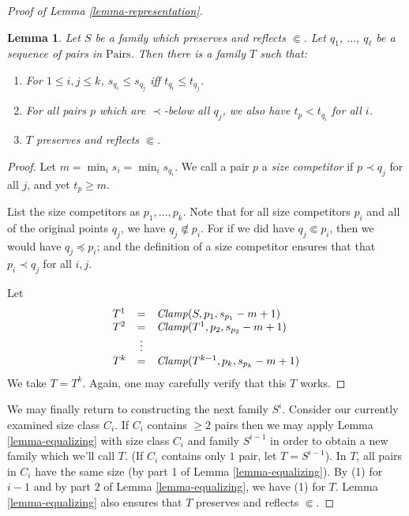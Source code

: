\documentclass[letterpaper]{article} %
\newtheorem{lemma}[theorem]{Lemma}
\theoremstyle{definition}
\newcommand{\Pairs}{\mbox{Pairs}}
\newcommand{\Clamp}{\protect{\mbox{\textit{Clamp}}}}
\newcommand{\precsubseteq}{\Subset}
\begin{document}
\begin{proof}[Proof of Lemma \ref{lemma-representation}]
\begin{lemma}

Let $S$ be a family which  preserves and reflects $\precsubseteq$.  
Let $q_1$, $\ldots$, $q_{\ell}$ be a sequence of pairs in $\Pairs$.  
Then there is a family $T$ such that:

\begin{enumerate} 
    \item For $1\leq i,j \leq k$, $s_{q_i} \leq s_{q_j}$ iff $t_{q_i} \leq t_{q_j}$. \label{competitor1}
    
    \item For all pairs $p $ which are $\prec$-below all $q_j$, we also have $t_{p}  <  t_{q_i}$ for all $i$. \label{competitor2}
  
    \item $T$ preserves and reflects $\precsubseteq$. 

\end{enumerate}

\label{lemma-sizeadjustment}
\end{lemma}
\begin{proof}
Let $m =  \min_i s_{i} = \min_i s_{q_i}$.
We call a pair $p$ a \emph{size competitor} if 
$p\prec q_j$ for all $j$, and yet  $t_p \geq m$.

List the size competitors as $p_1, \ldots, p_k$. 
 Note that for all size competitors $p_i$ and all of the original points
 $q_j$,  we have $q_j \not \precsubseteq p_i$.
For if we did have $q_j \precsubseteq p_i$, then we would have 
$q_j \preceq p_i$; and the definition of a size competitor
ensures that that $p_i \prec q_j$ for all $i, j$.


 Let \[ \begin{array}{lcl}
 T^1  & = &  \Clamp(S,p_1,  s_{p_1} -m + 1)\\

T^2 & = & \Clamp(T^1,p_2,  s_{p_2}-m + 1 )\\
  & \vdots   & \\
T^{k} & = & \Clamp(T^{k-1},p_k, s_{p_k}-m + 1 )\\
\end{array}
\]
We take $T = T^{k}$.  Again, one may carefully verify that this $T$ works.  %
\end{proof}


We may finally return to constructing the next family $S^i$.  Consider our currently examined size class $C_i$.  If $C_i$ contains $\ge 2$ pairs then we may apply Lemma \ref{lemma-equalizing} with size class $C_i$ and family $S^{i-1}$ in order to obtain a new family which we'll call $T$.  (If $C_i$ contains only $1$ pair, let $T = S^{i-1}$).  In $T$, all pairs in $C_i$ have the same size (by part 1 of Lemma \ref{lemma-equalizing}).  By (1) for $i-1$ and by part 2 of Lemma \ref{lemma-equalizing}, we have (1) for $T$.  Lemma \ref{lemma-equalizing} also ensures that $T$ preserves and reflects $\precsubseteq$.


\end{proof}
\end{document}
